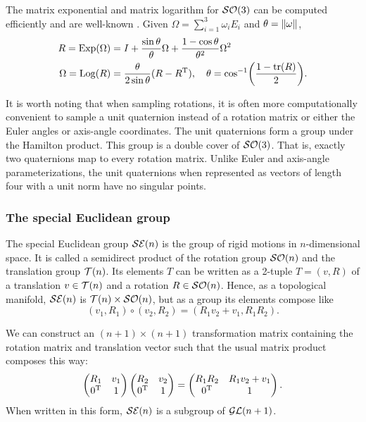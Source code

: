 \documentclass[../../main.tex]{subfiles}
\begin{document}
\begin{refsection}
	The matrix exponential and matrix logarithm for $\mathcal{SO} (3)$ can be computed efficiently and are well-known \supercite{chirikjianHarmonicAnalysisEngineers2016}.
	Given $\Omega = \sum_{i=1}^3 \omega_i E_i$ and $\theta = \norm{\omega}$,
	\begin{align*}
		R = \operatorname{Exp}(\Omega) & = I + \frac{\sin\theta}{\theta} \Omega + \frac{1 - \cos\theta}{\theta^2} \Omega^2           \\
		\Omega = \operatorname{Log}(R) & = \frac{\theta}{2\sin\theta}(R - {R}^\mathrm{T}), \quad \theta = \cos[-1](\frac{1 - \tr(R)}{2}).
	\end{align*}

	It is worth noting that when sampling rotations, it is often more computationally convenient to sample a unit quaternion instead of a rotation matrix or either the Euler angles or axis-angle coordinates.
	The unit quaternions form a group under the Hamilton product.
	This group is a double cover of $\mathcal{SO} (3)$.
	That is, exactly two quaternions map to every rotation matrix.
	Unlike Euler and axis-angle parameterizations, the unit quaternions when represented as vectors of length four with a unit norm have no singular points.

	\clearpage %
	\subsubsection{The special Euclidean group}\label{the-special-euclidean-group}

	The special Euclidean group $\mathcal{SE} (n)$ is the group of rigid motions in $n$-dimensional space.
	It is called a semidirect product of the rotation group $\mathcal{SO} (n)$ and the translation group $\mathcal{T} (n)$.
	Its elements $T$ can be written as a 2-tuple $T = (v, R)$ of a translation $v \in \mathcal{T} (n)$ and a rotation $R \in \mathcal{SO} (n)$.
	Hence, as a topological manifold, $\mathcal{SE} (n)$ is $\mathcal{T} (n) \times \mathcal{SO} (n)$, but as a group its elements compose like
	$$(v_1, R_1) \circ (v_2, R_2) = (R_1 v_2 + v_1, R_1 R_2).$$

	We can construct an $(n+1) \times (n+1)$ transformation matrix containing the rotation matrix and translation vector such that the usual matrix product composes this way:
	\[
		\begin{pmatrix}
			\mat{R_1}       & \vec{v_1} \\
			\trans{\vec{0}} & 1
		\end{pmatrix}
		\begin{pmatrix}
			\mat{R_2}       & \vec{v_2} \\
			\trans{\vec{0}} & 1
		\end{pmatrix} =
		\begin{pmatrix}
			\mat{R_1} \mat{R_2} & \mat{R_1} \vec{v_2} + \vec{v_1} \\
			\trans{\vec{0}}     & 1
		\end{pmatrix}.
	\]
	When written in this form, $\mathcal{SE} (n)$ is a subgroup of $\mathcal{GL} (n+1)$.


\end{refsection}
\end{document}
